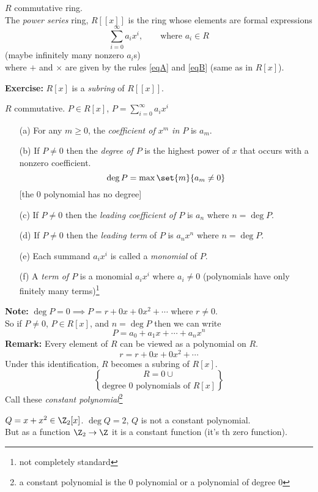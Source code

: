  $R$ commutative ring. \\
The \emph{power series} ring, $R[[x]]$ is the ring whose elements are formal expressions
\[ \sum_{i=0}^\infty a_i x^i, \qquad\text{where $a_i\in R$} \]
(maybe infinitely many nonzero $a_i$s) \\
where $+$ and $\times$ are given by the rules \eqref{eqA} and \eqref{eqB} (same as in $R[x]$).

\textbf{Exercise:} $R[x]$ is a \emph{subring} of $R[[x]]$.

 $R$ commutative.  $P\in R[x]$, $P=\sum_{i=0}^\infty a_ix^i$
\begin{enumerate}%
\item[(a)] For any $m\geq0$, the \emph{coefficient of $x^m$ in $P$} is $a_m$.
\item[(b)] If $P\neq0$ then the \emph{degree of $P$} is the highest power of $x$ that occurs with a nonzero coefficient.
\[ \deg P = \max\set{m}{a_m\neq0} \]
[the $0$ polynomial has no degree]
\item[(c)] If $P\neq0$ then the \emph{leading coefficient of $P$} is $a_n$ where $n=\deg P$.
\item[(d)] If $P\neq0$ then the \emph{leading term} of $P$ is $a_nx^n$ where $n=\deg P$.
\item[(e)] Each summand $a_ix^i$ is called a \emph{monomial} of $P$.
\item[(f)] A \emph{term of $P$} is a monomial $a_ix^i$ where $a_i\neq0$ (polynomials have only finitely many terms)\footnote{not completely standard}
\end{enumerate}
\textbf{Note:} $\deg P=0\implies P=r+0x+0x^2+\dotsb$ where $r\neq0$. \\
So if $P\neq0$, $P\in R[x]$, and $n=\deg P$ then we can write
\[ P = a_0 + a_1x + \dotsb + a_nx^n \]
\textbf{Remark:} Every element of $R$ can be viewed as a polynomial on $R$.
\[ r = r + 0x + 0x^2 + \dotsb \]
Under this identification, $R$ becomes a subring of $R[x]$.
\[ R = 0 \cup \brace{\text{degree $0$ polynomials of $R[x]$}} \]
Call these \emph{constant polynomial}\footnote{a constant polynomial is the $0$ polynomial or a polynomial of degree $0$}

\ex $Q=x+x^2\in\Z_2[x]$.  $\deg Q=2$, $Q$ is not a constant polynomial. \\
But as a function $\Z_2\to\Z$ it is a constant function (it's th zero function).

